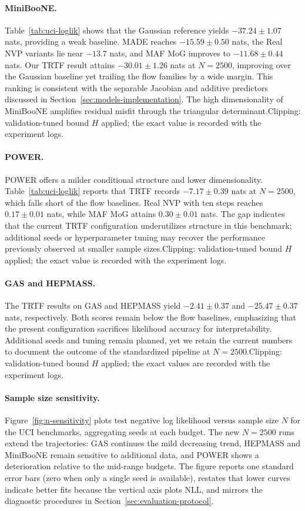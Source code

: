 \documentclass[11pt,a4paper,twoside]{book}\usepackage[]{graphicx}\usepackage[]{xcolor}
\begin{document}
\paragraph{MiniBooNE.} Table~\ref{tab:uci-loglik} shows that the Gaussian reference yields $-37.24 \pm 1.07$ nats, providing a weak baseline. MADE reaches $-15.59 \pm 0.50$ nats, the Real NVP variants lie near $-13.7$ nats, and MAF MoG improves to $-11.68 \pm 0.44$ nats. Our TRTF result attains $-30.01 \pm 1.26$ nats at $N=2500$, improving over the Gaussian baseline yet trailing the flow families by a wide margin. This ranking is consistent with the separable Jacobian and additive predictors discussed in Section~\ref{sec:models-implementation}. The high dimensionality of MiniBooNE amplifies residual misfit through the triangular determinant.\;Clipping: validation-tuned bound $H$ applied; the exact value is recorded with the experiment logs.

\paragraph{POWER.} POWER offers a milder conditional structure and lower dimensionality. Table~\ref{tab:uci-loglik} reports that TRTF records $-7.17 \pm 0.39$ nats at $N=2500$, which falls short of the flow baselines. Real NVP with ten steps reaches $0.17 \pm 0.01$ nats, while MAF MoG attains $0.30 \pm 0.01$ nats. The gap indicates that the current TRTF configuration underutilizes structure in this benchmark; additional seeds or hyperparameter tuning may recover the performance previously observed at smaller sample sizes.\;Clipping: validation-tuned bound $H$ applied; the exact value is recorded with the experiment logs.

\paragraph{GAS and HEPMASS.} The TRTF results on GAS and HEPMASS yield $-2.41 \pm 0.37$ and $-25.47 \pm 0.37$ nats, respectively. Both scores remain below the flow baselines, emphasizing that the present configuration sacrifices likelihood accuracy for interpretability. Additional seeds and tuning remain planned, yet we retain the current numbers to document the outcome of the standardized pipeline at $N=2500$.\;Clipping: validation-tuned bound $H$ applied; the exact values are recorded with the experiment logs.

\paragraph{Sample size sensitivity.} Figure~\ref{fig:n-sensitivity} plots test negative log likelihood versus sample size $N$ for the UCI benchmarks, aggregating seeds at each budget. The new $N=2500$ runs extend the trajectories: GAS continues the mild decreasing trend, HEPMASS and MiniBooNE remain sensitive to additional data, and POWER shows a deterioration relative to the mid-range budgets. The figure reports one standard error bars (zero when only a single seed is available), restates that lower curves indicate better fits because the vertical axis plots NLL, and mirrors the diagnostic procedures in Section~\ref{sec:evaluation-protocol}.
\end{document}

